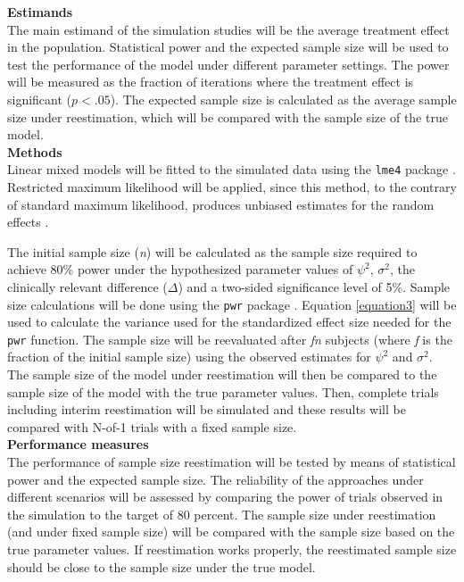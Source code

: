 \documentclass[11pt]{article}
\begin{document}
\vspace{1cm} %

\noindent \textbf{Estimands} \\
\noindent  The main estimand of the simulation studies will be the average treatment effect in the population. Statistical power and the expected sample size will be used to test the performance of the model under different parameter settings. The power will be measured as the fraction of iterations where the treatment effect is significant ($p < .05$). The expected sample size is calculated as the average sample size under reestimation, which will be compared with the sample size of the true model. \\

\noindent \textbf{Methods} \\
\noindent Linear mixed models will be fitted to the simulated data using the \verb+lme4+ package \cite{lme4}. Restricted maximum likelihood will be applied, since this method, to the contrary of standard maximum likelihood, produces unbiased estimates for the random effects \cite{corbeil1976}. 

The initial sample size (\textit{n}) will be calculated as the sample size required to achieve 80\% power under the hypothesized parameter values of $\psi^2$, $\sigma^2$, the clinically relevant difference ($\Delta$) and a two-sided significance level of 5\%. Sample size calculations will be done using the \verb+pwr+ package \cite{champely2018}. Equation \eqref{equation3} will be used to calculate the variance used for the standardized effect size needed for the \verb+pwr+ function. The sample size will be reevaluated after \textit{fn} subjects (where \textit{f} is the fraction of the initial sample size) using the observed estimates for $\psi^2$ and $\sigma^2$. The sample size of the model under reestimation will then be compared to the sample size of the model with the true parameter values. Then, complete trials including interim reestimation will be simulated and these results will be compared with N-of-1 trials with a fixed sample size. \\

\noindent \textbf{Performance measures} \\
\noindent The performance of sample size reestimation will be tested by means of statistical power and the expected sample size. The reliability of the approaches under different scenarios will be assessed by comparing the power of trials observed in the simulation to the target of 80 percent. The sample size under reestimation (and under fixed sample size) will be compared with the sample size based on the true parameter values. If reestimation works properly, the reestimated sample size should be close to the sample size under the true model. \\
\end{document}
